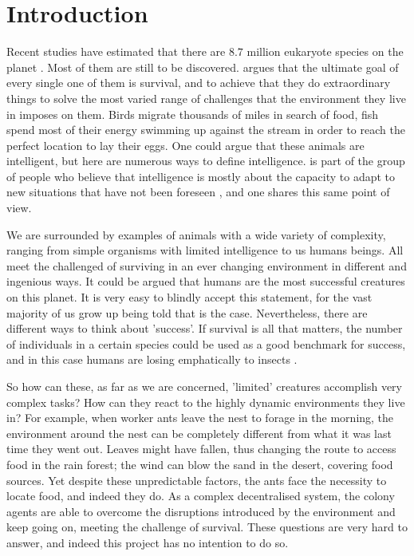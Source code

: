 \chapter{Introduction}
\label{ch:introduction}

Recent studies have estimated that there are $8.7$ million eukaryote species on the planet \cite{10.1371/journal.pbio.1001127} \cite{10.1371/journal.pbio.1001130}. Most of them are still to be discovered. \citeauthor{dawkins1990selfish} \cite{dawkins1990selfish} argues that the ultimate goal of every single one of them is survival, and to achieve that they do extraordinary things to solve the most varied range of challenges that the environment they live in imposes on them. Birds migrate thousands of miles in search of food, fish spend most of their  energy swimming up against the stream in order to reach the perfect location to lay their eggs. One could argue that these animals are intelligent, but here are numerous ways to define intelligence. \citeauthor{kennedy2001swarm} \cite{kennedy2001swarm} is part of the group of people who believe that intelligence is mostly about the capacity to adapt to new situations that have not been foreseen  \cite{kennedy2001swarm}, and one shares this same point of view.

We are surrounded by examples of animals with a wide variety of complexity, ranging from simple organisms with limited intelligence to us humans beings. All meet the challenged of surviving in an ever changing environment in  different and ingenious ways. It could be argued that humans are the most successful creatures on this planet. It is very easy to blindly accept this statement, for the vast majority of us grow up being told that is the case. Nevertheless, there are different ways to think about 'success'. If survival is all that matters, the number of individuals in a certain species could be used as a good benchmark for success, and in this case humans are losing emphatically to insects \cite{MAY16091988}.

So how can these, as far as we are concerned, 'limited' creatures accomplish very complex tasks? How can they react to the highly dynamic environments they live in? For example, when worker ants leave the nest to forage in the morning, the environment around the nest can be completely different from what it was last time they went out. Leaves might have fallen, thus changing the route to access food in the rain forest; the wind can blow the sand in the desert, covering food sources. Yet despite these unpredictable factors, the ants face the necessity to locate food, and indeed they do. As a complex decentralised system, the colony agents are able to overcome the disruptions introduced by the environment and keep going on, meeting the challenge of survival. These questions are very hard to answer, and indeed this project has no intention to do so. 
 
